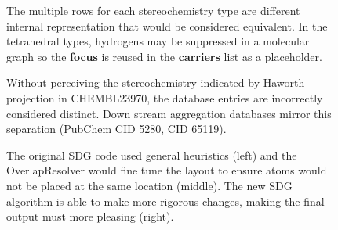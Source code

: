 \documentclass[doublespacing]{bmcart}
\begin{document}
\begin{backmatter}
\begin{figure}[h!]
  \caption{ 
  The multiple rows for each
  stereochemistry type are different internal representation that
  would be considered equivalent. In the tetrahedral types,
  hydrogens may be suppressed in a molecular graph so the
  \textbf{focus} is reused in the \textbf{carriers} list as a
  placeholder.}
\centering
\label{fig:stereodatastructure}
\end{figure}




\begin{figure}[h!]
  \caption{
    Without perceiving the stereochemistry indicated by Haworth
    projection in CHEMBL23970, the database entries are incorrectly
    considered distinct. Down stream aggregation databases mirror this
    separation (PubChem CID 5280, CID 65119).}
    \centering
    \label{fig:stereoprojections}
\end{figure}

\begin{figure}[h!]
  \caption{}
  \centering
  \label{fig:depiction}
\end{figure}

\begin{figure}[h!]
  \caption{
    The original SDG code used general heuristics (left) and the
    OverlapResolver would fine tune the layout to ensure atoms would not be placed
    at the same location (middle). The new SDG algorithm is able to
    make more rigorous changes, making the final output must more pleasing
    (right).}
    \label{fig:sdg}
\end{figure}

\begin{figure}[h!]
  \caption{}
  \centering
  \label{fig:sdgstereo}
\end{figure}



\end{backmatter}
\end{document}
